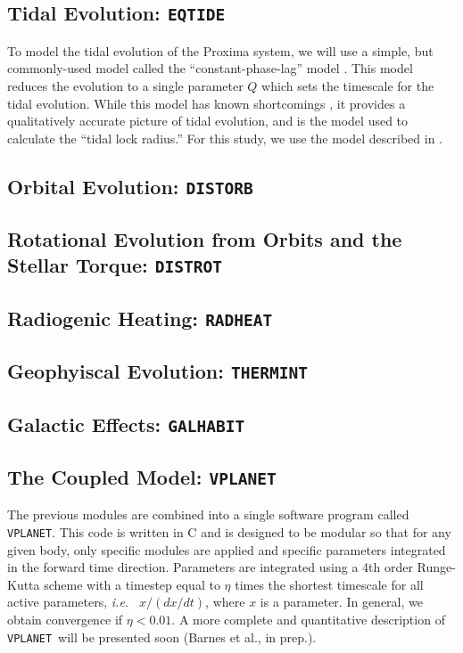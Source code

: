 \documentclass[preprint,12pt]{aastex}
\def\ie{{\it i.e.\ }}
\def\vplanet{\texttt{\footnotesize{VPLANET}}\xspace}
\def\distorb{\texttt{\footnotesize{DISTORB}}\xspace}
\def\distrot{\texttt{\footnotesize{DISTROT}}\xspace}
\def\eqtide{\texttt{\footnotesize{EQTIDE}}\xspace}
\def\radheat{\texttt{\footnotesize{RADHEAT}}\xspace}
\def\thermint{\texttt{\footnotesize{THERMINT}}\xspace}
\def\galhabit{\texttt{\footnotesize{GALHABIT}}\xspace}
\begin{document}
\subsection{Tidal Evolution: \eqtide}
\label{sec:models:eqtide}
To model the tidal evolution of the Proxima system, we will use a
simple, but commonly-used model called the ``constant-phase-lag''
model \citep{Goldreich66,Greenberg09,Heller11}. This model reduces the
evolution to a single parameter $Q$ which sets the timescale for the
tidal evolution. While this model has known shortcomings
\citep{ToumaWisdom94,EfroimskyMakarov13}, it provides a qualitatively
accurate picture of tidal evolution, and is the model \cite{Kasting93}
used to calculate the ``tidal lock radius.'' For this study, we use
the model described in \cite{Heller11}.

\subsection{Orbital Evolution: \distorb}
\label{sec:models:distorb}

\subsection{Rotational Evolution from Orbits and the Stellar Torque: \distrot}
\label{sec:models:distrot}

\subsection{Radiogenic Heating: \radheat}
\label{sec:models:radheat}

\subsection{Geophyiscal Evolution: \thermint}
\label{sec:models:thermint}

\subsection{Galactic Effects: \galhabit}
\label{sec:models:galhabit}

\subsection{The Coupled Model: \vplanet}
\label{sec:models:vplanet}
The previous modules are combined into a single software program
called \vplanet. This code is written in C and is designed to be
modular so that for any given body, only specific modules are applied
and specific parameters integrated in the forward time direction. 
Parameters are integrated
using a 4th order Runge-Kutta scheme with a timestep equal to $\eta$
times the shortest timescale for all active parameters, \ie
$x/(dx/dt)$, where $x$ is a parameter. In general, we obtain convergence if
$\eta < 0.01$. A more complete and quantitative description of
\vplanet~will be presented soon (Barnes et al., in prep.). 
\end{document}
